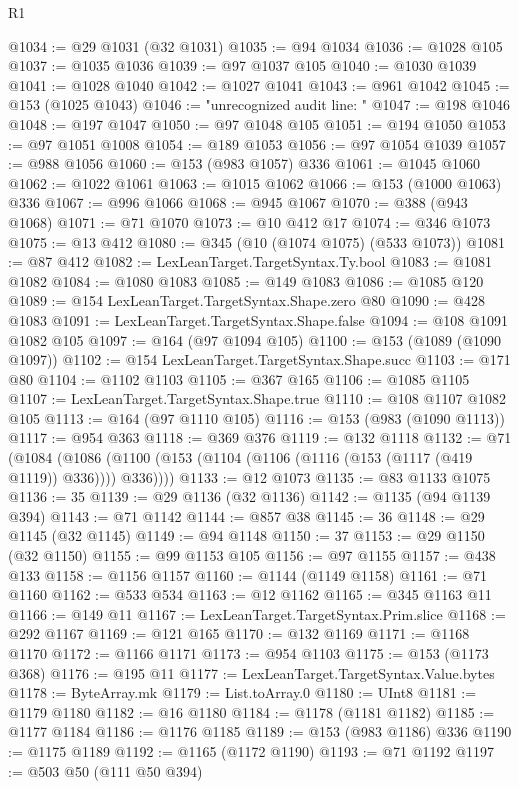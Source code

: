 \begin{lexlean}{R1}
\begin{coremodule}
@1034 := @29 @1031 (@32 @1031)
@1035 := @94 @1034
@1036 := @1028 @105
@1037 := @1035 @1036
@1039 := @97 @1037 @105
@1040 := @1030 @1039
@1041 := @1028 @1040
@1042 := @1027 @1041
@1043 := @961 @1042
@1045 := @153 (@1025 @1043)
@1046 := "unrecognized audit line: "
@1047 := @198 @1046
@1048 := @197 @1047
@1050 := @97 @1048 @105
@1051 := @194 @1050
@1053 := @97 @1051 @1008
@1054 := @189 @1053
@1056 := @97 @1054 @1039
@1057 := @988 @1056
@1060 := @153 (@983 @1057) @336
@1061 := @1045 @1060
@1062 := @1022 @1061
@1063 := @1015 @1062
@1066 := @153 (@1000 @1063) @336
@1067 := @996 @1066
@1068 := @945 @1067
@1070 := @388 (@943 @1068)
@1071 := @71 @1070
@1073 := @10 @412 @17
@1074 := @346 @1073
@1075 := @13 @412
@1080 := @345 (@10 (@1074 @1075) (@533 @1073))
@1081 := @87 @412
@1082 := LexLeanTarget.TargetSyntax.Ty.bool
@1083 := @1081 @1082
@1084 := @1080 @1083
@1085 := @149 @1083
@1086 := @1085 @120
@1089 := @154 LexLeanTarget.TargetSyntax.Shape.zero @80
@1090 := @428 @1083
@1091 := LexLeanTarget.TargetSyntax.Shape.false
@1094 := @108 @1091 @1082 @105
@1097 := @164 (@97 @1094 @105)
@1100 := @153 (@1089 (@1090 @1097))
@1102 := @154 LexLeanTarget.TargetSyntax.Shape.succ
@1103 := @171 @80
@1104 := @1102 @1103
@1105 := @367 @165
@1106 := @1085 @1105
@1107 := LexLeanTarget.TargetSyntax.Shape.true
@1110 := @108 @1107 @1082 @105
@1113 := @164 (@97 @1110 @105)
@1116 := @153 (@983 (@1090 @1113))
@1117 := @954 @363
@1118 := @369 @376
@1119 := @132 @1118
@1132 := @71
    (@1084 (@1086 (@1100 (@153 (@1104 (@1106 (@1116 (@153 (@1117 (@419 @1119)) @336)))) @336))))
@1133 := @12 @1073
@1135 := @83 @1133 @1075
@1136 := 35
@1139 := @29 @1136 (@32 @1136)
@1142 := @1135 (@94 @1139 @394)
@1143 := @71 @1142
@1144 := @857 @38
@1145 := 36
@1148 := @29 @1145 (@32 @1145)
@1149 := @94 @1148
@1150 := 37
@1153 := @29 @1150 (@32 @1150)
@1155 := @99 @1153 @105
@1156 := @97 @1155
@1157 := @438 @133
@1158 := @1156 @1157
@1160 := @1144 (@1149 @1158)
@1161 := @71 @1160
@1162 := @533 @534
@1163 := @12 @1162
@1165 := @345 @1163 @11
@1166 := @149 @11
@1167 := LexLeanTarget.TargetSyntax.Prim.slice
@1168 := @292 @1167
@1169 := @121 @165
@1170 := @132 @1169
@1171 := @1168 @1170
@1172 := @1166 @1171
@1173 := @954 @1103
@1175 := @153 (@1173 @368)
@1176 := @195 @11
@1177 := LexLeanTarget.TargetSyntax.Value.bytes
@1178 := ByteArray.mk
@1179 := List.toArray.{0}
@1180 := UInt8
@1181 := @1179 @1180
@1182 := @16 @1180
@1184 := @1178 (@1181 @1182)
@1185 := @1177 @1184
@1186 := @1176 @1185
@1189 := @153 (@983 @1186) @336
@1190 := @1175 @1189
@1192 := @1165 (@1172 @1190)
@1193 := @71 @1192
@1197 := @503 @50 (@111 @50 @394)

\end{coremodule}
\end{lexlean}
